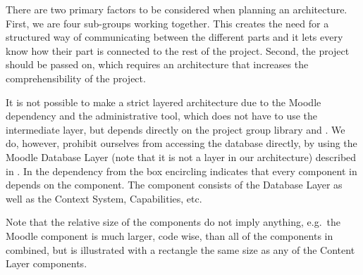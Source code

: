 There are two primary factors to be considered when planning an architecture. 
First, we are four sub-groups working together. 
This creates the need for a structured way of communicating between the different parts and it lets every \subgroup{} know how their part is connected to the rest of the project. 
Second, the project should be passed on, which requires an architecture that increases the comprehensibility of the project.

It is not possible to make a strict layered architecture due to the Moodle dependency and the administrative tool, which does not have to use the intermediate layer, but depends directly on the project group library and \moodle{}.
We do, however, prohibit ourselves from accessing the database directly, by using the Moodle Database Layer (note that it is not a layer in our architecture) described in .
In  the dependency from the box encircling \system{} indicates that every component in \system{} depends on the \moodle{} component.
The \moodle{} component consists of the Database Layer as well as the Context System, Capabilities, etc.

Note that the relative size of the components do not imply anything, e.g.\ the Moodle component is much larger, code wise, than all of the components in \system{} combined, but is illustrated with a rectangle the same size as any of the Content Layer components.













